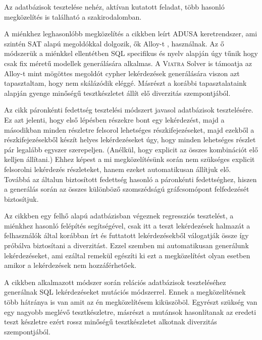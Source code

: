 Az adatbázisok tesztelése nehéz, aktívan kutatott feladat, több hasonló megközelítés is található a szakirodalomban.


A miénkhez leghasonlóbb megközelítés a \cite{DBLP:conf} cikkben leírt ADUSA keretrendszer, ami szintén SAT alapú megoldókkal dolgozik, ők Alloy-t \cite{Alloy:Language} , \cite{alloy:kodkod} használnak. Az ő módszerük a miénkkel ellentétben SQL specifikus és nyelv alapján úgy tűnik hogy csak fix méretű modellek generálására alkalmas. A \textsc{Viatra} Solver is támoatja az Alloy-t mint mögöttes megoldót cypher lekérdezések generálására viszon azt tapasztaltam, hogy nem skálázódik eléggé. Másrészt a korábbi tapasztalataink alapján \cite{semerath2018iterative} gyenge minőségű tesztkészletet állít elő diverzitás szempontjából.


Az \cite{myint2018test} cikk páronkénti fedettség tesztelési módszert javasol adatbázisok tesztelésére. Ez azt jelenti, hogy első lépésben részekre bont egy lekérdezést, majd a másodikban minden részletre felsorol lehetséges részkifejezéseket, majd ezekből a részkifejezésekből készít helyes lekérdezéseket úgy, hogy minden lehetséges részlet pár legalább egyszer szerepeljen. (Anélkül, hogy explicit az összes kombinációt elő kelljen állítani.) Ehhez képest a mi megközelítésünk során nem szükséges explicit felsorolni lekérdezés részleteket, hanem ezeket automatikusan állítjuk elő. Továbbá az általun biztosított fedettség hasonló a  páronkénti fedettséghez, hiszen a generálás során az összes különböző szomszédságú gráfcsomópont felfedezését biztosítjuk.
	 
 Az \cite{yan2018snowtrail} cikkben egy felhő alapú adatbázisban végeznek regressziós tesztelést, a miénkhez hasonló felépítés segítségével, csak itt a teszt lekérdezések halmazát a felhasználók által korábban írt és futtatott lekérdezésekből válogatják össze így próbálva biztosítani a diverzitást. Ezzel szemben mi automatikusan generálunk lekérdezéseket, ami ezáltal remekül egészíti ki ezt a megközelítést olyan esetben amikor a lekérdezések nem hozzáférhetőek. 

A \cite{tuya2006sqlmutation} cikkben alkalmazott módszer során relációs adatbázisok teszteléséhez generálnak SQL lekérdezéseket mutációs módszerrel. Ennek a megközelítésnek több hátránya is van amit az én megközelítésem kiküszöböl. Egyrészt szükség van egy nagyobb meglévő tesztkészletre, másrészt a mutánsok hasonlítanak az eredeti teszt készletre ezért rossz minőségű tesztkészletet alkotnak diverzitás szempontjából. 

